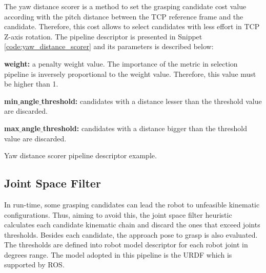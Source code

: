 The yaw distance scorer is a method to set the grasping candidate cost value according with the pitch distance between the TCP reference frame and the candidate. Therefore, this cost allows to select candidates with less effort in TCP Z-axis rotation. The pipeline descriptor is presented in Snippet \ref{code:yaw_distance_scorer} and its parameters is described below:

\begin{itemize_jp}
    \item \textbf{weight:} a penalty weight value. The importance of the metric in selection pipeline is inversely proportional to the weight value. Therefore, this value must be higher than 1.
    \item \textbf{min$\_$angle$\_$threshold:} candidates with a distance lesser than the threshold value are discarded.
    \item \textbf{max$\_$angle$\_$threshold:} candidates with a distance bigger than the threshold value are discarded.
\end{itemize_jp}


\begin{snippet}[h!]
\centering
{}
\caption{Yaw distance scorer pipeline descriptor example.}
\label{code:yaw_distance_scorer}
\end{snippet}

\subsection{Joint Space Filter}
\label{cap4:modular_grasping_architecture:sec:grasp_selection:subsec:joint_space_filter}

In run-time, some grasping candidates can lead the robot to unfeasible kinematic configurations. Thus, aiming to avoid this, the joint space filter heuristic calculates each candidate kinematic chain and discard the ones that exceed joints thresholds. Besides each candidate, the approach pose to grasp is also evaluated. The thresholds are defined into robot model descriptor for each robot joint in degrees range. The model adopted in this pipeline is the URDF which is supported by ROS.


